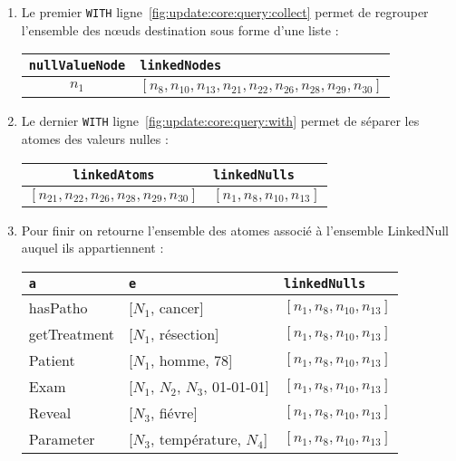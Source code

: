 \begin{example}
\begin{enumerate}[label=Etape~\arabic*]
		\item Le premier \verb|WITH| ligne~\ref{fig:update:core:query:collect} permet de regrouper l'ensemble des nœuds destination sous forme d'une liste :
		      \begin{center}
			      \begin{tabular}{cl}
				      \hline
				      \verb|nullValueNode|    & \verb|linkedNodes|                                                        \\
				      \hline
				      $n_{1}$                 & $[n_{8}, n_{10}, n_{13}, n_{21}, n_{22}, n_{26}, n_{28}, n_{29}, n_{30}]$ \\
				      \hline
			      \end{tabular}
		      \end{center}
		\item Le dernier \verb|WITH| ligne~\ref{fig:update:core:query:with} permet de séparer les atomes des valeurs nulles :
		      \begin{center}
			      \begin{tabular}{cl}
				      \hline
				      \verb|linkedAtoms|                                 & \verb|linkedNulls|               \\
				      \hline
				      $[n_{21}, n_{22}, n_{26}, n_{28}, n_{29}, n_{30}]$ & $[n_{1}, n_{8}, n_{10}, n_{13}]$ \\
				      \hline
			      \end{tabular}
		      \end{center}
		\item Pour finir on retourne l'ensemble des atomes associé à l'ensemble \textsf{LinkedNull} auquel ils appartiennent :
		      \begin{center}
			      \begin{tabular}{lll}
				      \hline
				      \verb|a|                & \verb|e|                        & \verb|linkedNulls|               \\
				      \hline
				      hasPatho                & [$N_1$, cancer]                 & $[n_{1}, n_{8}, n_{10}, n_{13}]$ \\
				      getTreatment            & [$N_1$, résection]              & $[n_{1}, n_{8}, n_{10}, n_{13}]$ \\
				      Patient                 & [$N_1$, homme, 78]              & $[n_{1}, n_{8}, n_{10}, n_{13}]$ \\
				      Exam                    & [$N_1$, $N_2$, $N_3$, 01-01-01] & $[n_{1}, n_{8}, n_{10}, n_{13}]$ \\
				      Reveal                  & [$N_3$, fiévre]                 & $[n_{1}, n_{8}, n_{10}, n_{13}]$ \\
				      Parameter               & [$N_3$, température, $N_4$]     & $[n_{1}, n_{8}, n_{10}, n_{13}]$ \\
				      \hline
			      \end{tabular}
		      \end{center}
	\end{enumerate}
\end{example}

